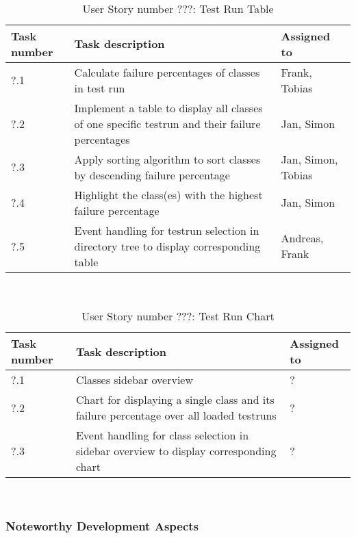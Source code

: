 \ \\ 

\begin{table}[h]
  \caption{User Story number ???: Test Run Table}
  \label{US_Table}
  \centering
  \begin{tabular}{p{1.5cm}|p{9cm}|p{3cm}|}
  	Task number & Task description & Assigned to \\ 
  	\hline
  	\hline
  	?.1 & Calculate failure percentages of classes in test run & Frank, Tobias \\ 
  	\hline
  	?.2 & Implement a table to display all classes of one specific testrun and their failure percentages & Jan, Simon \\ 
  	\hline
  	?.3 & Apply sorting algorithm to sort classes by descending failure percentage & Jan, Simon, Tobias \\
  	\hline
  	?.4 & Highlight the class(es) with the highest failure percentage & Jan, Simon \\
  	\hline
  	?.5 & Event handling for testrun selection in directory tree to display corresponding table & Andreas, Frank \\ 
  	\hline
  \end{tabular}
\end{table} 

\ \\ 

\begin{table}[h]
  \caption{User Story number ???: Test Run Chart}
  \label{US_Chart}
  \centering
  \begin{tabular}{p{1.5cm}|p{9cm}|p{3cm}|}
  	Task number & Task description & Assigned to \\ 
  	\hline
  	\hline
  	?.1 & Classes sidebar overview & ? \\ 
  	\hline
  	?.2 & Chart for displaying a single class and its failure percentage over all loaded testruns & ? \\ 
  	\hline
  	?.3 & Event handling for class selection in sidebar overview to display corresponding chart & ? \\
  	\hline
  \end{tabular}
\end{table} 

\ \\ 

\subsubsection*{Noteworthy Development Aspects}


